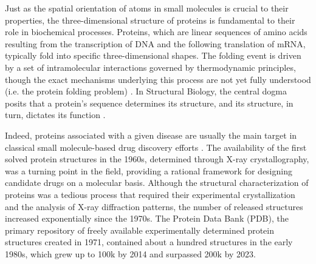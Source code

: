 Just as the spatial orientation of atoms in small molecules is crucial to their properties, the three-dimensional structure of proteins is fundamental to their role in biochemical processes. Proteins, which are linear sequences of amino acids resulting from the transcription of DNA and the following translation of mRNA, typically fold into specific three-dimensional shapes. The folding event is driven by a set of intramolecular interactions governed by thermodynamic principles, though the exact mechanisms underlying this process are not yet fully understood (i.e. the protein folding problem) \cite{anfinsen_principles_1973}. In Structural Biology, the central dogma posits that a protein's sequence determines its structure, and its structure, in turn, dictates its function \cite{maynard_smith_natural_1970, aharoni_evolvability_2005, redfern_exploring_2008}.

Indeed, proteins associated with a given disease are usually the main target in classical small molecule-based drug discovery efforts \cite{hughes_principles_2011, overington_how_2006, imming_drugs_2006}. The availability of the first solved protein structures in the 1960s, determined through X-ray crystallography, was a turning point in the field, providing a rational framework for designing candidate drugs on a molecular basis. Although the structural characterization of proteins was a tedious process that required their experimental crystallization and the analysis of X-ray diffraction patterns, the number of released structures increased exponentially since the 1970s. The Protein Data Bank (PDB)\cite{berman_protein_2000}, the primary repository of freely available experimentally determined protein structures created in 1971, contained about a hundred structures in the early 1980s, which grew up to 100k by 2014 and surpassed 200k by 2023\cite{burley_rcsb_2023}.

